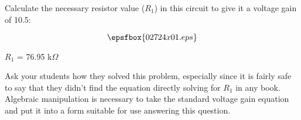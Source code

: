 

Calculate the necessary resistor value ($R_1$) in this circuit to give it a voltage gain of 10.5:

$$\epsfbox{02724x01.eps}$$







$R_1$ = 76.95 k$\Omega$







Ask your students how they solved this problem, especially since it is fairly safe to say that they didn't find the equation directly solving for $R_1$ in any book.  Algebraic manipulation is necessary to take the standard voltage gain equation and put it into a form suitable for use answering this question.




